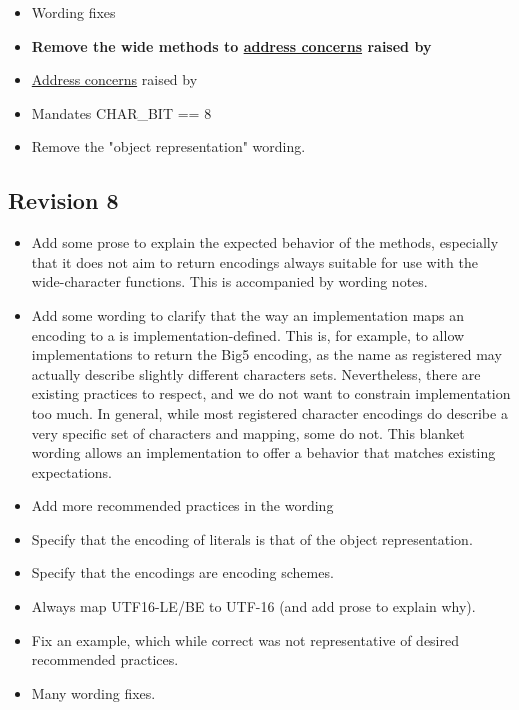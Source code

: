 \documentclass{wg21}
\begin{document}
\begin{itemize}
    \item Wording fixes
    \item \textbf{Remove the wide methods to \hyperref[P2491-concerns]{address concerns} raised by }
    \item \hyperref[P2498-concerns]{Address concerns} raised by 
    
    \item Mandates CHAR_BIT == 8
    \item Remove the "object representation" wording.
\end{itemize}

\subsection*{Revision 8}
\begin{itemize}
    \item Add some prose to explain the expected behavior of the  methods, especially that it does not aim to return encodings always suitable for use with the wide-character functions. This is accompanied by wording notes.
    \item Add some wording to clarify that the way an implementation maps an encoding to a  is implementation-defined.
    This is, for example, to allow implementations to return the Big5 encoding, as the name as registered may actually describe slightly different characters sets. Nevertheless, there are existing practices to respect, and we do not want to constrain implementation too much.
    In general, while most registered character encodings do describe a very specific set of characters and mapping, some do not. This blanket wording allows an implementation to offer a behavior that matches existing expectations.
    \item Add more recommended practices in the wording
    \item Specify that the encoding of literals is that of the object representation.
    \item Specify that the encodings are encoding schemes. 
    \item Always map UTF16-LE/BE to UTF-16 (and add prose to explain why).
    \item Fix an example, which while correct was not representative of desired recommended practices.
    \item Many wording fixes.
    
\end{itemize}
\end{document}

